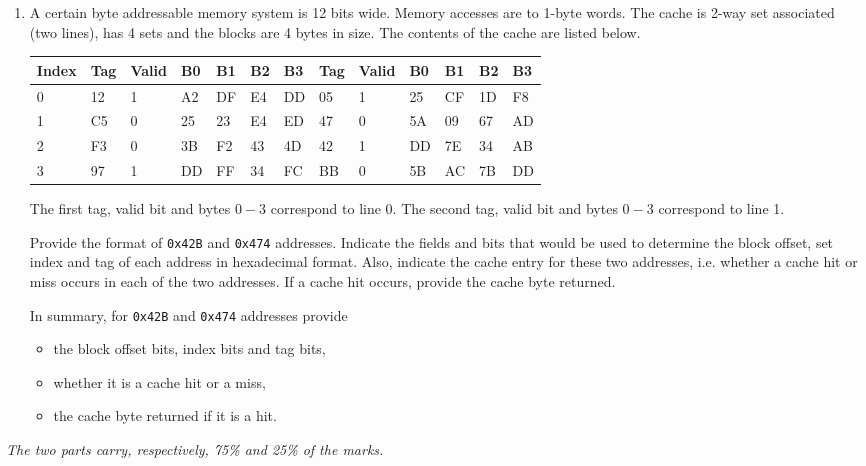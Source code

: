 \documentclass[11pt]{article}
\begin{document}
\begin{enumerate}
\begin{enumerate}
        \pagebreak

        \item A certain byte addressable memory system is 12 bits wide. 
        Memory accesses are to 1-byte words. 
        The cache is 2-way set associated (two lines), has 4 sets and the blocks are 4 bytes in size.
        The contents of the cache are listed below. 

        \begin{center}
            \begin{tabular}{|l|l|l|l|l|l|l||l|l|l|l|l|l|}
                \hline
                Index & Tag & Valid & B0 & B1 & B2 & B3 & Tag & Valid & B0 & B1 & B2 & B3 \\
                \hline 
                0 & 12 & 1 & A2 & DF & E4 & DD & 05 & 1 & 25 & CF & 1D & F8 \\
                1 & C5 & 0 & 25 & 23 & E4 & ED & 47 & 0 & 5A & 09 & 67 & AD \\
                2 & F3 & 0 & 3B & F2 & 43 & 4D & 42 & 1 & DD & 7E & 34 & AB \\
                3 & 97 & 1 & DD & FF & 34 & FC & BB & 0 & 5B & AC & 7B & DD \\
                \hline 
            \end{tabular}
        \end{center}

        The first tag, valid bit and bytes $0-3$ correspond to line 0. The second tag, valid bit and bytes $0-3$ correspond to line 1. 
        
        Provide the format of \texttt{0x42B} and \texttt{0x474} addresses.
        Indicate the fields and bits that would be used to determine the block offset, set index and tag of each address in hexadecimal format. 
        Also, indicate the cache entry for these two addresses, i.e. whether a cache hit or miss occurs in each of the two addresses. 
        If a cache hit occurs, provide the cache byte returned.

        In summary, for \texttt{0x42B} and \texttt{0x474} addresses provide
        \begin{itemize}
            \item the block offset bits, index bits and tag bits,
            \item whether it is a cache hit or a miss,
            \item the cache byte returned if it is a hit.
        \end{itemize}
    \end{enumerate}

    \vfill
    \emph{The two parts carry, respectively, 75\% and 25\% of the marks.}
\end{enumerate}
\end{document}
